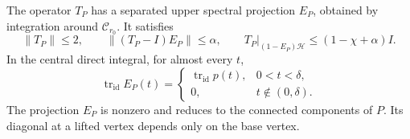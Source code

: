 \begin{proposition}
\label{spec:cover-projection}
The operator $T_P$ has a separated upper spectral projection $E_P$,
obtained by integration around $\mathcal C_{r_0}$.  It satisfies
\begin{equation}
 \|T_P\|\leq2,\qquad
 \|(T_P-I)E_P\|\leq\alpha,\qquad
 T_P|_{(1-E_P)\mathcal H}\leq(1-\chi+\alpha)I.
 \label{spec:cover-gap}
\end{equation}
In the central direct integral, for almost every $t$,
\begin{equation}
 \operatorname{tr}_{\mathrm{id}}E_P(t)
  =\begin{cases}
        \operatorname{tr}_{\mathrm{id}}p(t),&0<t<\delta,\\
        0,&t\notin(0,\delta).
    \end{cases}
 \label{spec:exact-fiber-trace}
\end{equation}
The projection $E_P$ is nonzero and reduces to the connected components of
$P$.  Its diagonal at a lifted vertex depends only on the base vertex.
\end{proposition}

